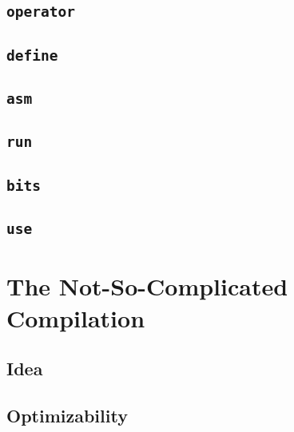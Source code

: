 \documentclass{article}
\let\oldsection\section
\renewcommand{\section}[2]{\oldsection{#1}\label{#2}}
\begin{document}
\subsection{\texttt{\textbf{operator}}}

\subsection{\texttt{\textbf{define}}}

\subsection{\texttt{\textbf{asm}}}

\subsection{\texttt{\textbf{run}}}

\subsection{\texttt{\textbf{bits}}}

\subsection{\texttt{\textbf{use}}}

\section{The Not-So-Complicated Compilation}{compilation}
\subsection{Idea}

\subsection{Optimizability}
\end{document}

